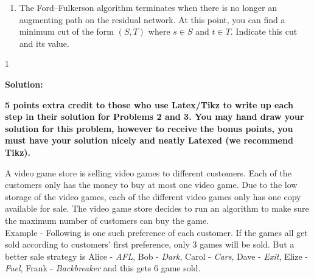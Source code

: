 \documentclass[9pt]{article}
\makeatletter
\def\solutions{1}
\newcounter{dummy}
\newcommand\myitem[1][]{\item[#1]\refstepcounter{dummy}\def\@currentlabel{#1}}
\makeatother
\begin{document}
\begin{enumerate}
	\myitem[(2b)]\label{2b} The Ford--Fulkerson algorithm terminates when there is no longer an augmenting path on the residual network. At this point, you can find a minimum cut of the form $(S,T)$ where $s\in S$ and $t\in T$. Indicate this cut and its value.
\end{enumerate}


\if\solutions1
\vspace{2mm}

\textbf{Solution:} \\


\fi

\newpage



\vspace{5mm}

\item  \textbf{5 points extra credit to those who use Latex/Tikz to write up each step in their solution for Problems 2 and 3. You may hand draw your solution for this problem, however to receive the bonus points, you must have your solution nicely and neatly Latexed (we recommend Tikz).}

A video game store is selling video games to different customers. Each of the customers only has the money to buy at most one video game. Due to the low storage of the video games, each of the different video games only has one copy available for sale. The video game store decides to run an algorithm to make sure the maximum number of customers can buy the game. \\
Example - Following is one such preference of each customer. If the games all get sold according to customers' first preference, only 3 games will be sold. But a better sale strategy is Alice - {\it AFL}, Bob - {\it Dark}, Carol - {\it Cars}, Dave - {\it Exit}, Elize - {\it Fuel}, Frank - {\it Backbreaker} and this gets 6 game sold. \\
\end{document}

